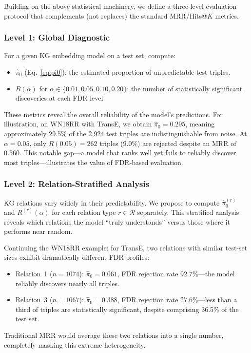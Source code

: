 Building on the above statistical machinery, we define a three-level evaluation protocol that complements (not replaces) the standard MRR/Hits@$K$ metrics.

\subsubsection{Level 1: Global Diagnostic}
For a given KG embedding model on a test set, compute:
\begin{itemize}
    \item $\hat{\pi}_0$ (Eq.~\ref{eq:pi0}): the estimated proportion of unpredictable test triples.
    \item $R(\alpha)$ for $\alpha \in \{0.01, 0.05, 0.10, 0.20\}$: the number of statistically significant discoveries at each FDR level.
\end{itemize}

These metrics reveal the overall reliability of the model's predictions.
For illustration, on WN18RR with TransE, we obtain $\hat{\pi}_0 = 0.295$, meaning approximately 29.5\% of the 2,924 test triples are indistinguishable from noise.
At $\alpha = 0.05$, only $R(0.05) = 262$ triples (9.0\%) are rejected despite an MRR of 0.560.
This notable gap---a model that ranks well yet fails to reliably discover most triples---illustrates the value of FDR-based evaluation.

\subsubsection{Level 2: Relation-Stratified Analysis}
KG relations vary widely in their predictability. We propose to compute $\hat{\pi}_0^{(r)}$ and $R^{(r)}(\alpha)$ for each relation type $r \in \mathcal{R}$ separately.
This stratified analysis reveals which relations the model ``truly understands'' versus those where it performs near random.

Continuing the WN18RR example: for TransE, two relations with similar test-set sizes exhibit dramatically different FDR profiles:
\begin{itemize}
    \item Relation~1 ($n=1074$): $\hat{\pi}_0 = 0.061$, FDR rejection rate 92.7\%---the model reliably discovers nearly all triples.
    \item Relation~3 ($n=1067$): $\hat{\pi}_0 = 0.388$, FDR rejection rate 27.6\%---less than a third of triples are statistically significant, despite comprising 36.5\% of the test set.
\end{itemize}
Traditional MRR would average these two relations into a single number, completely masking this extreme heterogeneity.

